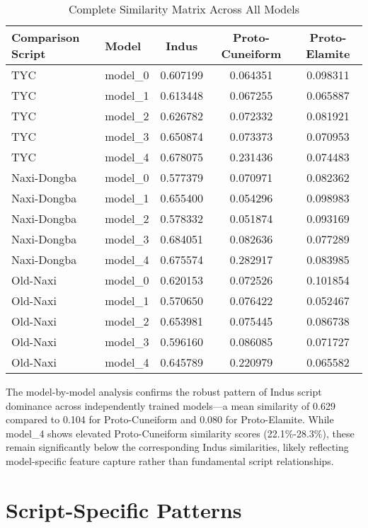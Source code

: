\documentclass[11pt,a4paper,oneside]{report}
\begin{document}
\begin{table}[H]
\centering
\caption{Complete Similarity Matrix Across All Models}
\label{tab:complete_similarity}
\begin{tabular}{llccc}
\hline
\textbf{Comparison Script} & \textbf{Model} & \textbf{Indus} & \textbf{Proto-Cuneiform} & \textbf{Proto-Elamite} \\
\hline
TYC & model\_0 & 0.607199 & 0.064351 & 0.098311 \\
TYC & model\_1 & 0.613448 & 0.067255 & 0.065887 \\
TYC & model\_2 & 0.626782 & 0.072332 & 0.081921 \\
TYC & model\_3 & 0.650874 & 0.073373 & 0.070953 \\
TYC & model\_4 & 0.678075 & 0.231436 & 0.074483 \\
\hline
Naxi-Dongba & model\_0 & 0.577379 & 0.070971 & 0.082362 \\
Naxi-Dongba & model\_1 & 0.655400 & 0.054296 & 0.098983 \\
Naxi-Dongba & model\_2 & 0.578332 & 0.051874 & 0.093169 \\
Naxi-Dongba & model\_3 & 0.684051 & 0.082636 & 0.077289 \\
Naxi-Dongba & model\_4 & 0.675574 & 0.282917 & 0.083985 \\
\hline
Old-Naxi & model\_0 & 0.620153 & 0.072526 & 0.101854 \\
Old-Naxi & model\_1 & 0.570650 & 0.076422 & 0.052467 \\
Old-Naxi & model\_2 & 0.653981 & 0.075445 & 0.086738 \\
Old-Naxi & model\_3 & 0.596160 & 0.086085 & 0.071727 \\
Old-Naxi & model\_4 & 0.645789 & 0.220979 & 0.065582 \\
\hline
\end{tabular}
\end{table}

The model-by-model analysis confirms the robust pattern of Indus script dominance across independently trained models—a mean similarity of 0.629 compared to 0.104 for Proto-Cuneiform and 0.080 for Proto-Elamite. While model\_4 shows elevated Proto-Cuneiform similarity scores (22.1\%-28.3\%), these remain significantly below the corresponding Indus similarities, likely reflecting model-specific feature capture rather than fundamental script relationships.


\section{Script-Specific Patterns}
\end{document}
